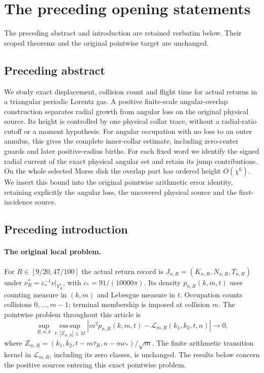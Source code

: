 \section{The preceding opening statements}
\label{app:v71-retained-front}
The preceding abstract and introduction are retained verbatim below.
Their scoped theorems and the original pointwise target are unchanged.
\subsection*{Preceding abstract}

We study exact displacement, collision count and flight time for
actual returns in a triangular periodic Lorentz gas. A positive
finite-scale angular-overlap construction separates radial growth
from angular loss on the original physical source. Its height is
controlled by one physical collar trace, without a radial-ratio
cutoff or a moment hypothesis. For angular occupation with no loss
to an outer annulus, this gives the complete inner-collar estimate,
including zero-center guards and later positive-radius births.
For each fixed word we identify the signed radial current of the
exact physical angular set and retain its jump contributions.
On the whole selected Morse disk the overlap part has ordered
height $O(\chi^6)$. We insert this bound into the original pointwise
arithmetic error identity, retaining explicitly the angular loss,
the uncovered physical source and the first-incidence source.

\subsection*{Preceding introduction}


\paragraph{The original local problem.}
For $R\in[9/20,47/100]$ the actual return record is
$J_{n,R}=(K_{n,R},N_{n,R},T_{n,R})$ under
$\nu_R^*=c_*^{-1}\nu|_{Y_R^*}$, with $c_*=91/(10000\pi)$.
Its density $p_{n,R}(k,m,t)$ uses counting measure in $(k,m)$
and Lebesgue measure in $t$. Occupation counts collisions
$0,\ldots,m-1$; terminal membership is imposed at collision $m$.
The pointwise problem throughout this article is
\begin{equation}\label{eq:intro-v70-pointwise-target}
 \sup_{R,n,k}\operatorname*{ess\,sup}_{t:\,|Z_{m,R}|\le M}
 \left|m^2p_{n,R}(k,m,t)-\mathcal L_{m,R}(k_1,k_2,t,n)\right|
 \longrightarrow0,
\end{equation}
where $Z_{m,R}=(k_1,k_2,t-m\bar\tau_R,n-mc_*)/\sqrt m$.
The finite arithmetic transition kernel in $\mathcal L_{m,R}$,
including its zero classes, is unchanged. The results below concern
the positive sources entering this exact pointwise problem.

